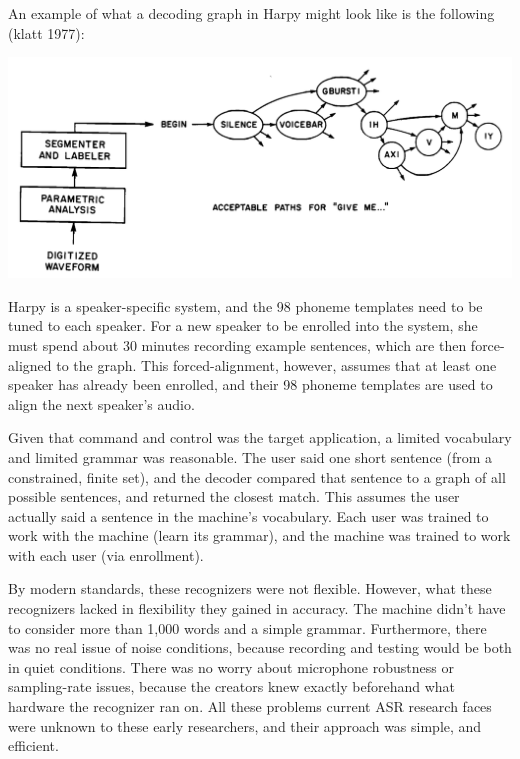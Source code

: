 \documentclass[10pt,a4paper]{article}
\begin{document}
An example of what a decoding graph in Harpy might look like is the following (klatt 1977):


\begin{center}
\includegraphics[width=.9\textwidth,keepaspectratio]{figs/harpy-graph.png}
\end{center}


Harpy is a speaker-specific system, and the 98 phoneme templates need to be tuned to each speaker. For a new speaker to be enrolled into the system, she must spend about 30 minutes recording example sentences, which are then force-aligned to the graph. This forced-alignment, however, assumes that at least one speaker has already been enrolled, and their 98 phoneme templates are used to align the next speaker's audio.




Given that command and control was the target application, a limited vocabulary and limited grammar was reasonable. The user said one short sentence (from a constrained, finite set), and the decoder compared that sentence to a graph of all possible sentences, and returned the closest match. This assumes the user actually said a sentence in the machine's vocabulary. Each user was trained to work with the machine (learn its grammar), and the machine was trained to work with each user (via enrollment). 



By modern standards, these recognizers were not flexible. However, what these recognizers lacked in flexibility they gained in accuracy. The machine didn't have to consider more than 1,000 words and a simple grammar. Furthermore, there was no real issue of noise conditions, because recording and testing would be both in quiet conditions. There was no worry about microphone robustness or sampling-rate issues, because the creators knew exactly beforehand what hardware the recognizer ran on. All these problems current ASR research faces were unknown to these early researchers, and their approach was simple, and efficient.
\end{document}
